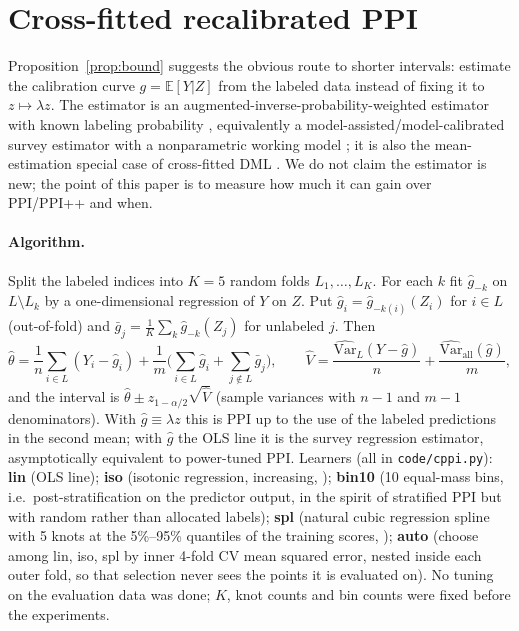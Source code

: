 \section{Cross-fitted recalibrated PPI}\label{sec:method}
Proposition~\ref{prop:bound} suggests the obvious route to shorter intervals: estimate the calibration curve $g=\mathbb E[Y|Z]$ from the labeled data instead of fixing it to $z\mapsto\lambda z$. The estimator is an augmented-inverse-probability-weighted estimator with known labeling probability \citep{robins1994estimation}, equivalently a model-assisted/model-calibrated survey estimator with a nonparametric working model \citep{sarndal1992model,montanari2005nonparametric}; it is also the mean-estimation special case of cross-fitted DML \citep{chernozhukov2018dml}. We do not claim the estimator is new; the point of this paper is to measure how much it can gain over PPI/PPI++ and when.

\paragraph{Algorithm.} Split the labeled indices into $K=5$ random folds $L_1,\dots,L_K$. For each $k$ fit $\hat g_{-k}$ on $L\setminus L_k$ by a one-dimensional regression of $Y$ on $Z$. Put $\hat g_i=\hat g_{-k(i)}(Z_i)$ for $i\in L$ (out-of-fold) and $\bar g_j=\frac1K\sum_k\hat g_{-k}(Z_j)$ for unlabeled $j$. Then
\[
\hat\theta=\frac1n\sum_{i\in L}(Y_i-\hat g_i)+\frac1m\Big(\sum_{i\in L}\hat g_i+\sum_{j\notin L}\bar g_j\Big),\qquad
\hat V=\frac{\widehat{\mathrm{Var}}_L(Y-\hat g)}{n}+\frac{\widehat{\mathrm{Var}}_{\text{all}}(\hat g)}{m},
\]
and the interval is $\hat\theta\pm z_{1-\alpha/2}\sqrt{\hat V}$ (sample variances with $n{-}1$ and $m{-}1$ denominators). With $\hat g\equiv\lambda z$ this is PPI up to the use of the labeled predictions in the second mean; with $\hat g$ the OLS line it is the survey regression estimator, asymptotically equivalent to power-tuned PPI. Learners (all in \texttt{code/cppi.py}): \textbf{lin} (OLS line); \textbf{iso} (isotonic regression, increasing, \citealp{barlow1972isotonic}); \textbf{bin10} (10 equal-mass bins, i.e.\ post-stratification on the predictor output, in the spirit of stratified PPI \citealp{fisch2024stratified} but with random rather than allocated labels); \textbf{spl} (natural cubic regression spline with 5 knots at the 5\%--95\% quantiles of the training scores, \citealp{hastie2009elements}); \textbf{auto} (choose among lin, iso, spl by inner 4-fold CV mean squared error, nested inside each outer fold, so that selection never sees the points it is evaluated on). No tuning on the evaluation data was done; $K$, knot counts and bin counts were fixed before the experiments.

